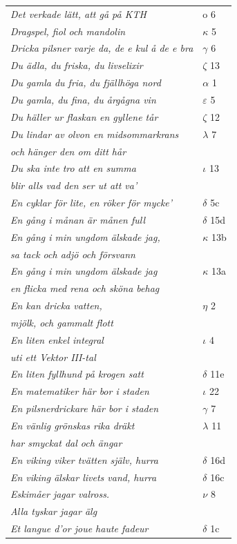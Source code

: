 \documentclass[a6paper,10pt]{article}
\begin{document}
\newpage
\begin{table}[!h]
\begin{tabular}{l l}
\textit{Det verkade lätt, att gå på KTH}     &o 6\\
\textit{Dragspel, fiol och mandolin}	&$\kappa$ 5\\
\textit{Dricka pilsner varje da, de e kul å de e bra}	&$\gamma$ 6\\
\textit{Du ädla, du friska, du livselixir}	&$\zeta$ 13\\
\textit{Du gamla du fria, du fjällhöga nord}	&$\alpha$ 1\\
\textit{Du gamla, du fina, du årgågna vin}	&$\varepsilon$ 5\\
\textit{Du häller ur flaskan en gyllene tår}	&$\zeta$ 12\\
\textit{Du lindar av olvon en midsommarkrans}	&$\lambda$ 7\\
\textit{och hänger den om ditt hår} &\\
\textit{Du ska inte tro att en summa}	&$\iota$ 13\\
\textit{blir alls vad den ser ut att va'} &\\
\textit{En cyklar för lite, en röker för mycke'}	&$\delta$ 5c\\
\textit{En gång i månan är månen full}	&$\delta$ 15d\\
\textit{En gång i min ungdom älskade jag,}	&$\kappa$ 13b\\
\textit{sa tack och adjö och försvann} &\\
\textit{En gång i min ungdom älskade jag}	&$\kappa$ 13a\\
\textit{en flicka med rena och sköna behag} &\\
\textit{En kan dricka vatten,}	&$\eta$ 2\\
\textit{mjölk, och gammalt flott} &\\
\textit{En liten enkel integral}	&$\iota$ 4\\
\textit{uti ett Vektor III-tal} &\\
\textit{En liten fyllhund på krogen satt}	&$\delta$ 11e\\
\textit{En matematiker här bor i staden} &$\iota$ 22\\
\textit{En pilsnerdrickare här bor i staden}	&$\gamma$ 7\\
\textit{En vänlig grönskas rika dräkt}	&$\lambda$ 11\\
\textit{har smyckat dal och ängar} &\\
\textit{En viking viker tvätten själv, hurra} &$\delta$ 16d\\
\textit{En viking älskar livets vand, hurra}	&$\delta$ 16c\\
\textit{Eskimåer jagar valross.}	&$\nu$ 8\\
\textit{Alla tyskar jagar älg} &\\
\textit{Et langue d'or joue haute fadeur}	&$\delta$ 1c\\
\end{tabular}
\end{table}
\end{document}
